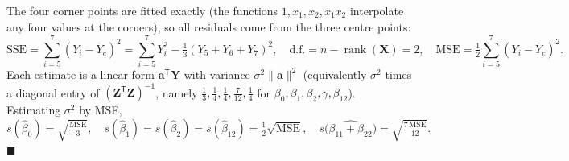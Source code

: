\documentclass[11pt]{article}
\DeclareMathOperator{\rank}{rank}
\newcommand{\bX}{\mathbf{X}}
\newcommand{\bY}{\mathbf{Y}}
\newcommand{\bZ}{\mathbf{Z}}
\newcommand{\ba}{\mathbf{a}}
\newcommand{\T}{^{\mathsf{T}}}
\newcommand{\inv}{^{-1}}
\theoremstyle{remark}
\begin{document}
The four corner points are fitted exactly (the functions $1,x_1,x_2,x_1x_2$ interpolate any four values at
the corners), so all residuals come from the three centre points:
\[
\mathrm{SSE}=\sum_{i=5}^{7}(Y_i-\bar Y_c)^2=\sum_{i=5}^7 Y_i^2-\tfrac13(Y_5+Y_6+Y_7)^2,
\quad \mathrm{d.f.}=n-\rank(\bX)=2,
\quad \mathrm{MSE}=\tfrac12\sum_{i=5}^{7}(Y_i-\bar Y_c)^2.
\]
Each estimate is a linear form $\ba\T\bY$ with variance $\sigma^2\lVert\ba\rVert^2$ (equivalently $\sigma^2$
times a diagonal entry of $(\bZ\T\bZ)\inv$, namely $\tfrac13,\tfrac14,\tfrac14,\tfrac{7}{12},\tfrac14$ for
$\beta_0,\beta_1,\beta_2,\gamma,\beta_{12}$). Estimating $\sigma^2$ by MSE,
\[
s(\hat\beta_0)=\sqrt{\tfrac{\mathrm{MSE}}{3}},\quad
s(\hat\beta_1)=s(\hat\beta_2)=s(\hat\beta_{12})=\tfrac12\sqrt{\mathrm{MSE}},\quad
s\big(\widehat{\beta_{11}{+}\beta_{22}}\big)=\sqrt{\tfrac{7\,\mathrm{MSE}}{12}}.
\]
\hfill$\blacksquare$
\end{document}
